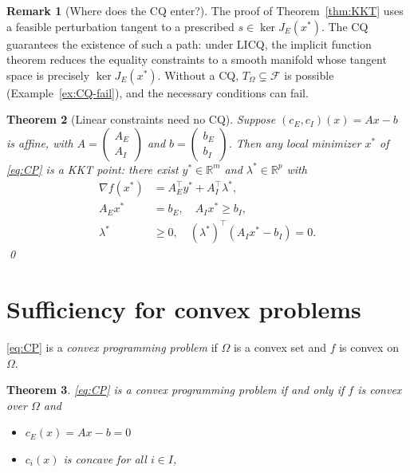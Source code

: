 \documentclass[11pt,a4paper]{report}
\theoremstyle{plain}
\newtheorem{theorem}{Theorem}[chapter]
\theoremstyle{definition}
\newtheorem{remark}[theorem]{Remark}
\newcommand{\R}{\mathbb{R}}
\newcommand{\grad}{\nabla}
\newcommand{\trans}{^{\top}}
\begin{document}
\begin{remark}[Where does the CQ enter?]
The proof of Theorem~\ref{thm:KKT} uses a feasible perturbation tangent to a
prescribed $s\in\ker J_{E}(x^{*})$. The CQ guarantees the existence of such a
path: under LICQ, the implicit function theorem reduces the equality
constraints to a smooth manifold whose tangent space is precisely
$\ker J_{E}(x^{*})$. Without a CQ, $T_{\Omega}\subsetneq\mathcal{F}$ is
possible (Example~\ref{ex:CQ-fail}), and the necessary conditions can fail.
\end{remark}

\begin{theorem}[Linear constraints need no CQ]\label{thm:KKT-linear}
Suppose $(c_{E},c_{I})(x)=Ax-b$ is affine, with
$A=\begin{pmatrix}A_{E}\\A_{I}\end{pmatrix}$ and
$b=\begin{pmatrix}b_{E}\\b_{I}\end{pmatrix}$. Then any local minimizer $x^{*}$
of \eqref{eq:CP} is a KKT point: there exist $y^{*}\in\R^{m}$ and
$\lambda^{*}\in\R^{p}$ with
\begin{align*}
\grad f(x^{*})&=A_{E}\trans y^{*}+A_{I}\trans\lambda^{*},\\
A_{E}x^{*}&=b_{E},\quad A_{I}x^{*}\ge b_{I},\\
\lambda^{*}&\ge 0,\quad (\lambda^{*})\trans(A_{I}x^{*}-b_{I})=0.
\end{align*}
\qed
\end{theorem}

\section{Sufficiency for convex problems}

\eqref{eq:CP} is a \emph{convex programming problem} if $\Omega$ is a convex set and $f$ is convex on $\Omega$. 

\begin{theorem}
  \eqref{eq:CP} is a convex programming problem if and only if $f$ is convex over $\Omega$ and 
  \begin{itemize}
    \item $c_E(x) = Ax - b = 0$
    \item $c_i(x)$ is concave for all $i \in I$,
  \end{itemize}
\end{theorem}
\end{document}
